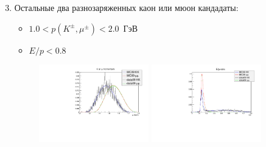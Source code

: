 \documentclass[unicode]{beamer}
\begin{document}
\begin{frame}
	\begin{enumerate}
			\setcounter{enumi}{2}
	\item Остальные два разнозаряженных каон или мюон кандадаты:
		\begin{itemize}
			\item $1.0 < p(K^\pm, \mu^\pm ) < 2.0 $~ГэВ
			\item $E/p < 0.8$
		\end{itemize}
			\begin{figure}
			\begin{center}
				\includegraphics[width=0.45\textwidth]{fig/p.pdf} \hfill
				\includegraphics[width=0.45\textwidth]{fig/Ep.pdf}
			\end{center}
			\end{figure}

	\end{enumerate}
\end{frame}
\end{document}
